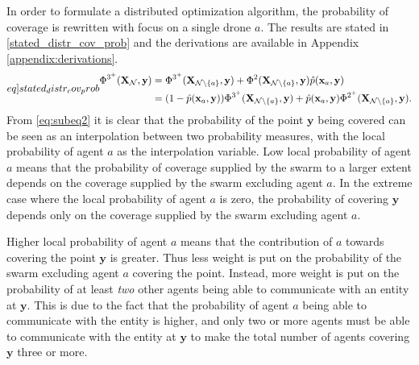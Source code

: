 In order to formulate a distributed optimization algorithm, the probability of coverage is rewritten with focus on a single drone $a$.
The results are stated in \eqref{stated_distr_cov_prob} and the derivations are available in Appendix \ref{appendix:derivations}.
\begin{subequations}\label[eq]{stated_distr_cov_prob}
  \begin{align}
    \Phi^{3^{+}}(\mathbf{X}_{\mathcal{N}}, \mathbf{y}) &= \Phi^{3^{+}}(\mathbf{X}_{\mathcal{N}\setminus\{a\}}, \mathbf{y}) + \Phi^{2}(\mathbf{X}_{\mathcal{N}\setminus\{a\}}, \mathbf{y})\hat{p}(\mathbf{x}_{a}, \mathbf{y})\label{eq:subeq1}\\
    &= (1-\hat{p}(\mathbf{x}_{a}, \mathbf{y}))\Phi^{3^{+}}(\mathbf{X}_{\mathcal{N}\setminus\{a\}}, \mathbf{y}) + \hat{p}(\mathbf{x}_{a}, \mathbf{y})\Phi^{2^{+}}(\mathbf{X}_{\mathcal{N}\setminus\{a\}}, \mathbf{y})\label{eq:subeq2}.
  \end{align}
\end{subequations}
From \eqref{eq:subeq2} it is clear that the probability of the point $\mathbf{y}$ being covered can be seen as an interpolation between two probability measures, 
with the local probability of agent $a$ as the interpolation variable. Low local probability of agent $a$ means that the probability of coverage supplied by the swarm to a larger extent depends on the coverage supplied by
the swarm excluding agent $a$. In the extreme case where the local probability of agent $a$ is zero, the probability of covering $\mathbf{y}$ depends only on the coverage supplied by the swarm excluding agent $a$.

Higher local probability of agent $a$ means that the contribution of $a$ towards covering the point $\mathbf{y}$ is greater. 
Thus less weight is put on the probability of the swarm excluding agent $a$ covering the point. Instead, more weight is put on the probability of at least \textit{two} other agents being able to communicate with an entity at $\mathbf{y}$. 
This is due to the fact that the probability of agent $a$ being able to communicate with the entity is higher, and only two or more agents must be able to communicate with the entity at $\mathbf{y}$ to make the total number of agents covering $\mathbf{y}$ three or more.

